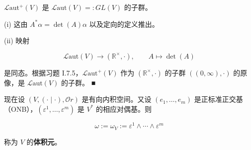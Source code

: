 \begin{remark}
\begin{subitems}
$ \mathcal{L}\mathrm{aut}^{+}(V) $ 是 $ \mathcal{L}\mathrm{aut}(V) =: GL(V) $ 的子群。

\proofhead
(i) 这由 $ A^{*}\alpha = \det(A)\alpha $ 以及定向的定义推出。
\end{subitems}

(ii) 映射

\[
\mathcal{L}\mathrm{aut}(V) \to (\mathbb{R}^{\times}, \cdot) , \qquad A \mapsto \det(A)
\]

是同态。根据习题 I.7.5，$ \mathcal{L}\mathrm{aut}^{+}(V) $ 作为 $ (\mathbb{R}^{\times}, \cdot) $ 的子群 $ ((0,\infty), \cdot) $ 的原像，是 $ \mathcal{L}\mathrm{aut}(V) $ 的子群。 \nobreak\hspace{0.35em}■

现在设 $ (V, (\cdot\mid\cdot), \mathcal{O}r) $ 是有向内积空间。又设 $ (e_{1},\ldots,e_{m}) $ 是正标准正交基（ONB），$ (\varepsilon^{1},\ldots,\varepsilon^{m}) $ 是 $ V^{*} $ 的相应对偶基。则

\[
\omega := \omega_{V} := \varepsilon^{1}\wedge\cdots\wedge\varepsilon^{m}
\]

称为 $ V $ 的\textbf{体积元}。

\end{remark}


